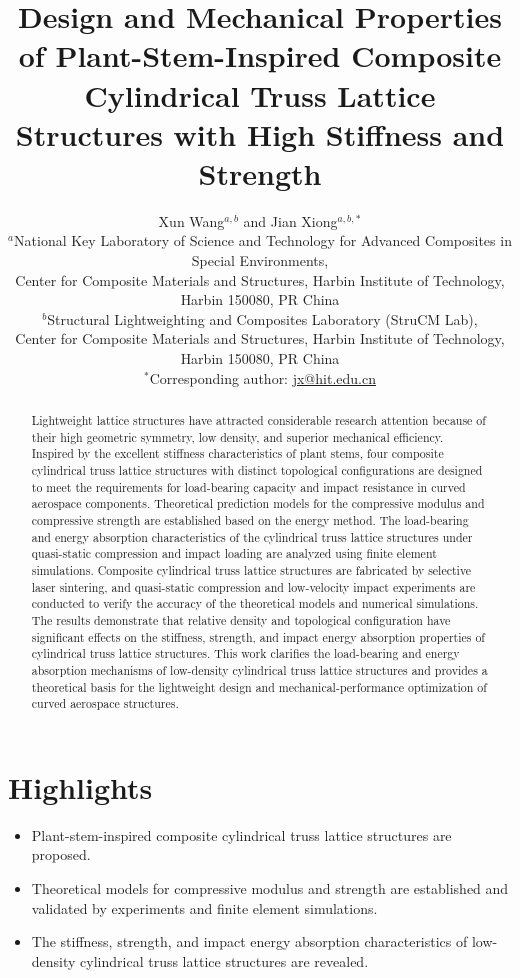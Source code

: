 \documentclass[12pt,a4paper]{article}
\title{Design and Mechanical Properties of Plant-Stem-Inspired Composite Cylindrical Truss Lattice Structures with High Stiffness and Strength}
\author{
	Xun Wang$^{a,b}$ and Jian Xiong$^{a,b,*}$\\[0.5em]
	\small $^{a}$National Key Laboratory of Science and Technology for Advanced Composites in Special Environments,\\
	\small Center for Composite Materials and Structures, Harbin Institute of Technology, Harbin 150080, PR China\\
	\small $^{b}$Structural Lightweighting and Composites Laboratory (StruCM Lab),\\
	\small Center for Composite Materials and Structures, Harbin Institute of Technology, Harbin 150080, PR China\\[0.5em]
	\small $^{*}$Corresponding author: \href{mailto:jx@hit.edu.cn}{jx@hit.edu.cn}
}
\date{}
\begin{document}
	
	\maketitle
	
	\section*{Highlights}
	
	\begin{itemize}
		\item Plant-stem-inspired composite cylindrical truss lattice structures are proposed.
		\item Theoretical models for compressive modulus and strength are established and validated by experiments and finite element simulations.
		\item The stiffness, strength, and impact energy absorption characteristics of low-density cylindrical truss lattice structures are revealed.
	\end{itemize}
	
	\begin{abstract}
		Lightweight lattice structures have attracted considerable research attention because of their high geometric symmetry, low density, and superior mechanical efficiency. Inspired by the excellent stiffness characteristics of plant stems, four composite cylindrical truss lattice structures with distinct topological configurations are designed to meet the requirements for load-bearing capacity and impact resistance in curved aerospace components. Theoretical prediction models for the compressive modulus and compressive strength are established based on the energy method. The load-bearing and energy absorption characteristics of the cylindrical truss lattice structures under quasi-static compression and impact loading are analyzed using finite element simulations. Composite cylindrical truss lattice structures are fabricated by selective laser sintering, and quasi-static compression and low-velocity impact experiments are conducted to verify the accuracy of the theoretical models and numerical simulations. The results demonstrate that relative density and topological configuration have significant effects on the stiffness, strength, and impact energy absorption properties of cylindrical truss lattice structures. This work clarifies the load-bearing and energy absorption mechanisms of low-density cylindrical truss lattice structures and provides a theoretical basis for the lightweight design and mechanical-performance optimization of curved aerospace structures.
	\end{abstract}
	
\end{document}
